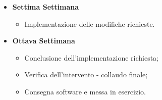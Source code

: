 {\begin{itemize}
\begin{itemize}
            \item Implementazione delle modifiche richieste.
        \end{itemize}
        \item \textbf{Settima Settimana}
        \begin{itemize}
            \item Implementazione delle modifiche richieste.
        \end{itemize}
        \item \textbf{Ottava Settimana}
        \begin{itemize}
            \item Conclusione dell'implementazione richiesta;
            \item Verifica dell'intervento - collaudo finale;
            \item Consegna software e messa in esercizio.
        \end{itemize}
    \end{itemize}
}

\newcommand{\totaleOre}{300}

\newcommand{\obiettiviObbligatori}{
	 \item \underline{\textit{O01}}: Acquisizione competenze sulle tematiche sopra descritte;
	 \item \underline{\textit{O02}}: Capacità di raggiungere gli obiettivi richiesti in autonomia seguendo il cronoprogramma;
	 \item \underline{\textit{O03}}: Portare a termine le modifiche richieste dal cliente con una percentuale di superamento pari al 50\%.
}

\newcommand{\obiettiviDesiderabili}{
    \item \underline{\textit{D01}}: Portare a termine le modifiche richieste dal cliente con una percentuale di superamento pari all'80\%.
}

\newcommand{\obiettiviFacoltativi}{
	 \item \underline{\textit{F01}}: Acquisizione competenze sul framework Spring Cloud.
}
